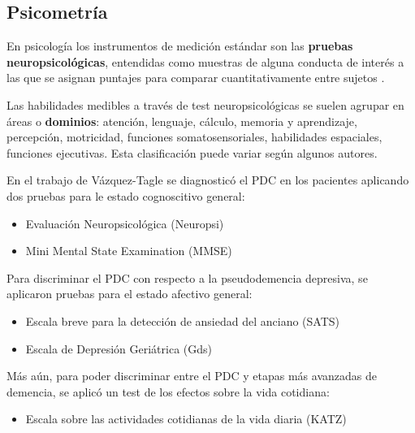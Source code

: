 
\subsection{Psicometría}

En psicología los instrumentos de medición estándar son las \textbf{pruebas neuropsicológicas}, 
entendidas como muestras de alguna conducta de interés a las que se asignan puntajes para comparar 
cuantitativamente entre sujetos \cite{Ardila12}.

Las habilidades medibles a través de test neuropsicológicas se suelen agrupar en áreas o 
\textbf{dominios}: atención, lenguaje, cálculo, memoria y aprendizaje, percepción, motricidad, 
funciones somatosensoriales, habilidades espaciales, funciones ejecutivas. Esta clasificación puede
variar según algunos autores.
%
%

En el trabajo de Vázquez-Tagle \cite{VazquezTagle16} se diagnosticó el PDC en los pacientes 
aplicando dos pruebas para le estado cognoscitivo general:
%
\begin{itemize}
\item {Evaluaci\'on Neuropsicol\'ogica (Neuropsi)} \cite{Solis03}
\item {Mini Mental State Examination (MMSE)} \cite{Velasco15}
\end{itemize}
%

Para discriminar el PDC con respecto a la pseudodemencia depresiva, se aplicaron pruebas para el
estado afectivo general:
%
\begin{itemize}
\item {Escala breve para la detecci\'on de ansiedad del anciano (SATS)} \cite{Vargas11}
\item {Escala de Depresi\'on Geri\'atrica (Gds)} \cite{Greenberg12,Cuijpers13}
\end{itemize}

Más aún, para poder discriminar entre el PDC y etapas más avanzadas de demencia, se aplicó un
test de los efectos sobre la vida cotidiana:
%
\begin{itemize}
\item {Escala sobre las actividades cotidianas de la vida diaria (KATZ)} \cite{Roumec14}
\end{itemize}


